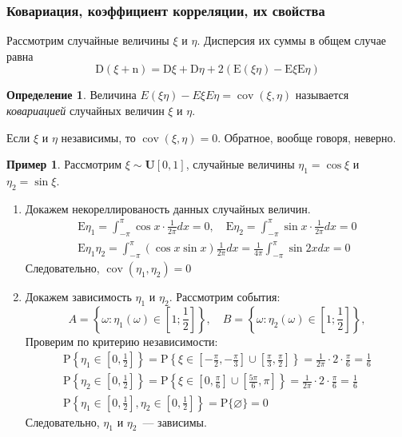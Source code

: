 \documentclass[oneside,final,14pt]{extreport}
\theoremstyle{definition}
\newtheorem{defn}{Определение}[section]
\newtheorem*{exmp}{Пример}
\begin{document}
\subsubsection{Ковариация, коэффициент корреляции, их свойства}

Рассмотрим случайные величины $\xi$ и $\eta$. Дисперсия их суммы в общем случае равна
\begin{equation*}
    \mathrm{D}(\xi+\mathrm{n})=\mathrm{D} \xi+\mathrm{D} \eta+2(\mathrm{E}(\xi \eta)-\mathrm{E} \xi \mathrm{E} \eta)
\end{equation*}
\begin{defn}
    Величина $E(\xi \eta)-E \xi E \eta = \operatorname{cov}(\xi, \eta)$ называется {\it ковариацией} случайных величин $\xi$ и $\eta$.
\end{defn}
Если $\xi$ и $\eta$ независимы, то $\operatorname{cov}(\xi, \eta) = 0$. Обратное, вообще говоря, неверно.
\begin{exmp}
    Рассмотрим $\xi \sim \mathbf{U}[0,1]$, случайные величины $\eta_{1}=\cos \xi$ и $\eta_{2}=\sin \xi$.
    \begin{enumerate}
        \item Докажем некореллированость данных случайных величин.
        \begin{gather*}
            \mathrm{E} \eta_{1}=\int_{-\pi}^{\pi} \cos x \cdot \frac{1}{2 \pi} d x=0, \quad \mathrm{E} \eta_{2}=\int_{-\pi}^{\pi} \sin x \cdot \frac{1}{2 \pi} d x=0 \\
            \mathrm{E} \eta_{1} \eta_{2}=\int_{-\pi}^{\pi}(\cos x \sin x) \frac{1}{2 \pi} d x=\frac{1}{4 \pi} \int_{-\pi}^{\pi} \sin 2 x d x=0
        \end{gather*}
        Следовательно, $\operatorname{cov}(\eta_1, \eta_2) = 0$
        \item Докажем зависимость $\eta_1$ и $\eta_2$. Рассмотрим события:
        \begin{equation*}
            A = \left\{ \omega: \eta_1(\omega) \in \left[1;\frac{1}{2} \right] \right\}, \quad
            B = \left\{ \omega: \eta_2(\omega) \in \left[1;\frac{1}{2} \right] \right\},
        \end{equation*}
        Проверим по критерию независимости:
        \begin{gather*}
            \mathrm{P}\left\{\eta_{1} \in\left[0, \frac{1}{2}\right]\right\}=\mathrm{P}\left\{\xi \in\left[-\frac{\pi}{2},-\frac{\pi}{3}\right] \cup\left[\frac{\pi}{3}, \frac{\pi}{2}\right]\right\}=\frac{1}{2 \pi} \cdot 2 \cdot \frac{\pi}{6}=\frac{1}{6} \\
            \mathrm{P}\left\{\eta_{2} \in\left[0, \frac{1}{2}\right]\right\}=\mathrm{P}\left\{\xi \in\left[0, \frac{\pi}{6}\right] \cup\left[\frac{5 \pi}{6}, \pi\right]\right\}=\frac{1}{2 \pi} \cdot 2 \cdot \frac{\pi}{6}=\frac{1}{6} \\
            \mathrm{P}\left\{\eta_{1} \in\left[0, \frac{1}{2}\right], \eta_{2} \in\left[0, \frac{1}{2}\right]\right\}=\mathrm{P}\{\varnothing\}=0
        \end{gather*}
        Следовательно, $\eta_1$ и $\eta_2$~--- зависимы.
    \end{enumerate}
\end{exmp}
\end{document}
